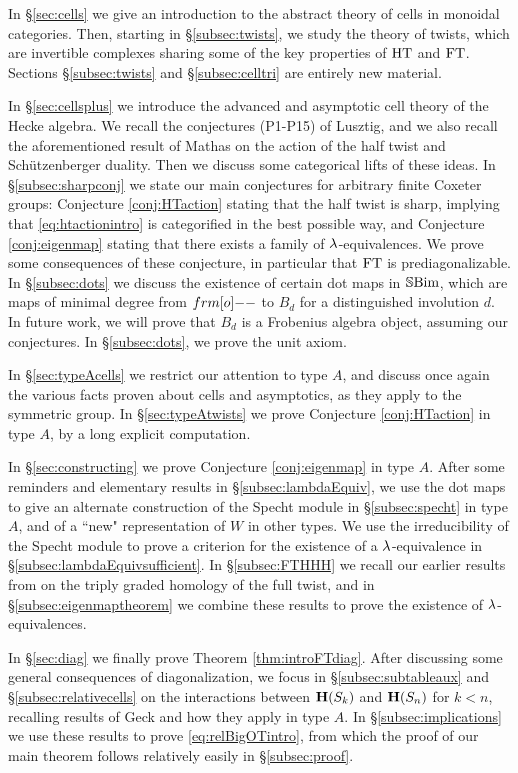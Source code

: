 In \S\ref{sec:cells} we give an introduction to the abstract theory of cells in monoidal categories. Then, starting in \S\ref{subsec:twists}, we study the theory of twists, which are invertible complexes sharing some of the key properties of $\operatorname{HT}$ and $\operatorname{FT}$. Sections \S\ref{subsec:twists} and \S\ref{subsec:celltri} are entirely new material.

In \S\ref{sec:cellsplus} we introduce the advanced and asymptotic cell theory of the Hecke algebra. We recall the conjectures (P1-P15) of Lusztig, and we also recall the aforementioned
result of Mathas on the action of the half twist and Sch\"utzenberger duality. Then we discuss some categorical lifts of these ideas. In \S\ref{subsec:sharpconj} we state our main
conjectures for arbitrary finite Coxeter groups: Conjecture \ref{conj:HTaction} stating that the half twist is sharp, implying that \eqref{eq:htactionintro} is categorified in the best
possible way, and Conjecture \ref{conj:eigenmap} stating that there exists a family of $\lambda$-equivalences. We prove some consequences of these conjecture, in particular that $\operatorname{FT}$ is
prediagonalizable. In \S\ref{subsec:dots} we discuss the existence of certain dot maps in ${\mathbb{S}}{\rm Bim }$, which are maps of minimal degree from $\one$ to $B_d$ for a distinguished involution
$d$. In future work, we will prove that $B_d$ is a Frobenius algebra object, assuming our conjectures. In \S\ref{subsec:dots}, we prove the unit axiom.

In \S\ref{sec:typeAcells} we restrict our attention to type $A$, and discuss once again the various facts proven about cells and asymptotics, as they apply to the symmetric group. In \S\ref{sec:typeAtwists} we prove Conjecture \ref{conj:HTaction} in type $A$, by a long explicit computation.

In \S\ref{sec:constructing} we prove Conjecture \ref{conj:eigenmap} in type $A$. After some reminders and elementary results in \S\ref{subsec:lambdaEquiv}, we use the dot maps to give an
alternate construction of the Specht module in \S\ref{subsec:specht} in type $A$, and of a ``new" representation of $W$ in other types. We use the irreducibility of the Specht module to
prove a criterion for the existence of a $\lambda$-equivalence in \S\ref{subsec:lambdaEquivsufficient}. In \S\ref{subsec:FTHHH} we recall our earlier results from \cite{ElHog16a} on the triply
graded homology of the full twist, and in \S\ref{subsec:eigenmaptheorem} we combine these results to prove the existence of $\lambda$-equivalences.

In \S\ref{sec:diag} we finally prove Theorem \ref{thm:introFTdiag}. After discussing some general consequences of diagonalization, we focus in \S\ref{subsec:subtableaux} and \S\ref{subsec:relativecells} on the interactions between ${\mathbf H}(S_k)$ and ${\mathbf H}(S_n)$ for $k < n$, recalling results of Geck and how they apply in type $A$. In \S\ref{subsec:implications} we use these results to prove \eqref{eq:relBigOTintro}, from which the proof of our main theorem follows relatively easily in \S\ref{subsec:proof}. 

